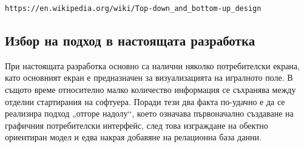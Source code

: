 \begin{lstlisting}
https://en.wikipedia.org/wiki/Top-down_and_bottom-up_design
\end{lstlisting}

\subsection{Избор на подход в настоящата разработка}

При настоящата разработка основно са налични няколко потребителски екрана, като основният екран е предназначен за визуализацията на игралното поле. В същото време относително малко количество информация се съхранява между отделни стартирания на софтуера. Поради тези два факта по-удачно е да се реализира подход „отгоре надолу“, което означава първоначално създаване на графичния потребителски интерфейс, след това изграждане на обектно ориентиран модел и едва накрая добавяне на релационна база данни. 

